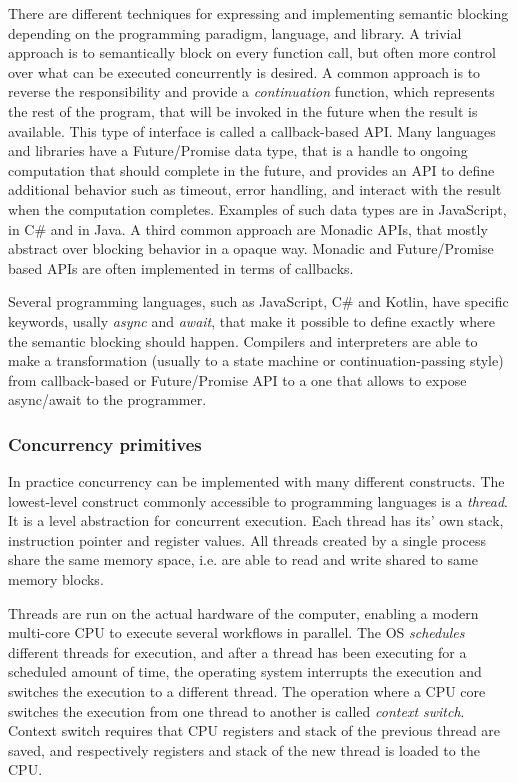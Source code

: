 There are different techniques for expressing and implementing semantic blocking depending on the programming paradigm, language, and library. A trivial approach is to semantically block on every function call, but often more control over what can be executed concurrently is desired. A common approach is to reverse the responsibility and provide a \textit{continuation} function, which represents the rest of the program, that will be invoked in the future when the result is available. This type of interface is called a callback-based API. Many languages and libraries have a Future/Promise data type, that is a handle to ongoing computation that should complete in the future, and provides an API to define additional behavior such as timeout, error handling, and interact with the result when the computation completes. Examples of such data types are  in JavaScript,  in C\# and  in Java. A third common approach are Monadic APIs, that mostly abstract over blocking behavior in a opaque way. Monadic and Future/Promise based APIs are often implemented in terms of callbacks.

Several programming languages, such as JavaScript, C\# and Kotlin, have specific keywords, usally \textit{async} and \textit{await}, that make it possible to define exactly where the semantic blocking should happen. Compilers and interpreters are able to make a transformation (usually to a state machine or continuation-passing style) from callback-based or Future/Promise API to a one that allows to expose async/await to the programmer.


\subsubsection{Concurrency primitives}
In practice concurrency can be implemented with many different constructs. The lowest-level construct commonly accessible to programming languages is a \textit{thread}. It is a  level abstraction for concurrent execution. Each thread has its' own stack, instruction pointer and  register values. All threads created by a single process share the same memory space, i.e. are able to read and write shared to same memory blocks.

Threads are run on the actual hardware of the computer, enabling a modern multi-core CPU to execute several workflows in parallel. The OS \textit{schedules} different threads for execution, and after a thread has been executing for a scheduled amount of time, the operating system interrupts the execution and switches the execution to a different thread. The operation where a CPU core switches the execution from one thread to another is called \textit{context switch}. Context switch requires that CPU registers and stack of the previous thread are saved, and respectively registers and stack of the new thread is loaded to the CPU.

